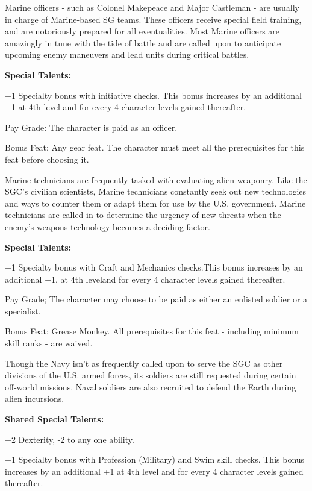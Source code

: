 Marine officers - such as Colonel Makepeace and Major Castleman - are usually in charge of Marine-based SG teams. These officers receive special field training, and are notoriously prepared for all eventualities. Most Marine officers are amazingly in tune with the tide of battle and are called upon to anticipate upcoming enemy maneuvers and lead units during critical battles.

\textbf{Special Talents:}
\begin{itemize*}
\item +1 Specialty bonus with initiative checks. This bonus increases by an additional +1 at 4th level and for every 4 character levels gained thereafter.
\item Pay Grade: The character is paid as an officer.
\item Bonus Feat: Any gear feat. The character must meet all the prerequisites for this feat before choosing it.
\end{itemize*}

Marine technicians are frequently tasked with evaluating alien weaponry. Like the SGC's civilian scientists, Marine technicians constantly seek out new technologies and ways to counter them or adapt them for use by the U.S. government. Marine technicians are called in to determine the urgency of new threats when the enemy's weapons technology becomes a deciding factor.

\textbf{Special Talents:}
\begin{itemize*}
\item +1 Specialty bonus with Craft and Mechanics checks.This bonus increases by an additional +1. at 4th leveland for every 4 character levels gained thereafter.
\item Pay Grade; The character may choose to be paid as either an enlisted soldier or a specialist.
\item Bonus Feat: Grease Monkey. All prerequisites for this feat - including minimum skill ranks - are waived.
\end{itemize*}

Though the Navy isn't as frequently called upon to serve the SGC as other divisions of the U.S. armed forces, its soldiers are still requested during certain off-world missions. Naval soldiers are also recruited to defend the Earth during alien incursions.

\textbf{Shared Special Talents:}
\begin{itemize*}
\item +2 Dexterity, -2 to any one ability.
\item +1 Specialty bonus with Profession (Military) and Swim skill checks. This bonus increases by an additional +1 at 4th level and for every 4 character levels gained thereafter.
\end{itemize*}

